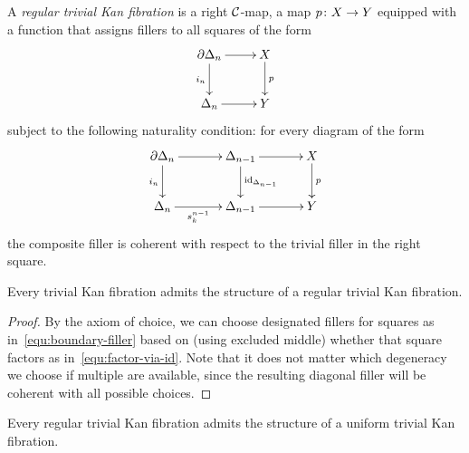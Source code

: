 \documentclass[reqno,10pt,a4paper,oneside]{amsart}
\begin{document}
\begin{definition} A \emph{regular trivial Kan fibration} is a right $\cal{C}$-map, \ie a map $p \co X \to Y$ 
equipped with a function that assigns fillers to all squares of the form
\begin{equation}
\label{equ:boundary-filler}
\xycenter{
\partial \Delta_n \ar[d]_{i_n} \ar[r] & X \ar[d]^{p} \\
\Delta_n \ar[r] & Y } 
\end{equation}
subject to the following naturality condition: for every diagram of the form
\begin{equation}
\label{equ:factor-via-id}
{\vcenter{\hbox{\xymatrix@C=1.2cm{
  \partial \Delta_n
  \ar[r]
  \ar[d]_{i_n}
&
  \Delta_{n-1}
  \ar[r]
  \ar[d]^{\id_{\Delta_{n-1}}}
&
  X
  \ar[d]^{p}
\\
  \Delta_n
  \ar[r]_-{s_k^{n-1}}
&
  \Delta_{n-1}
  \ar[r]
&
  Y
}}}}
\end{equation}
the composite filler is coherent with respect to the trivial filler in the right square. 
\end{definition}


\begin{lemma}[ZFC] \label{triv-Kan-is-regular}
Every trivial Kan fibration admits the structure of a regular trivial Kan fibration.
\end{lemma}

\begin{proof} By the axiom of choice, we can choose  designated fillers for squares as in~\eqref{equ:boundary-filler}
 based on (using excluded middle) whether that square factors as in~\eqref{equ:factor-via-id}. Note that it does not matter which degeneracy we choose if multiple are available, since the resulting diagonal filler will be coherent with 
 all possible choices.
\end{proof} 


\begin{lemma} \label{reg-triv-is-unif-Kan}
Every regular trivial Kan fibration admits the structure of a uniform trivial Kan fibration.
\end{lemma}
\end{document}
